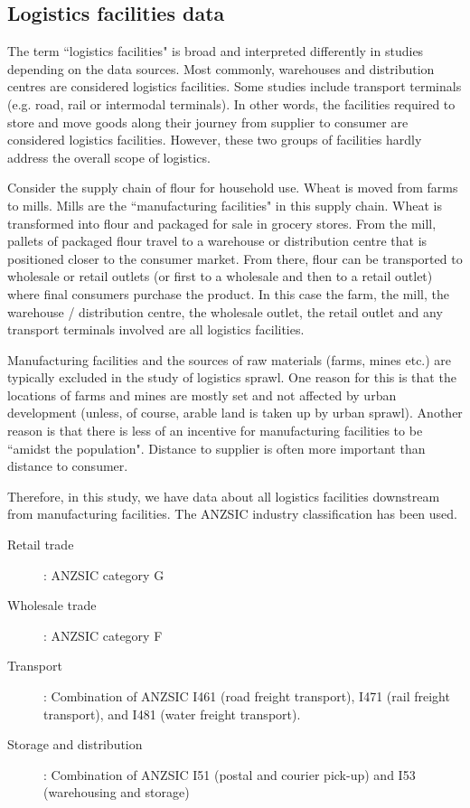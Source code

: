 \documentclass[3p, a4paper, authoryear, 11pt, fleqn, review]{elsarticle}
\begin{document}
\subsection{Logistics facilities data}
\label{sec:LogDat}
The term ``logistics facilities" is broad and interpreted differently in studies depending on the data sources. Most commonly, warehouses and distribution centres are considered logistics facilities. Some studies include transport terminals (e.g. road, rail or intermodal terminals). In other words, the facilities required to store and move goods along their journey from supplier to consumer are considered logistics facilities. However, these two groups of facilities hardly address the overall scope of logistics. 

Consider the supply chain of flour for household use. Wheat is moved from farms to mills. Mills are the ``manufacturing facilities" in this supply chain. Wheat is transformed into flour and packaged for sale in grocery stores. From the mill, pallets of packaged flour travel to a warehouse or distribution centre that is positioned closer to the consumer market. From there, flour can be transported to wholesale or retail outlets (or first to a wholesale and then to a retail outlet) where final consumers purchase the product. In this case the farm, the mill, the warehouse / distribution centre, the wholesale outlet, the retail outlet and any transport terminals involved are all logistics facilities. 

Manufacturing facilities and the sources of raw materials (farms, mines etc.) are typically excluded in the study of logistics sprawl. One reason for this is that the locations of farms and mines are mostly set and not affected by urban development (unless, of course, arable land is taken up by urban sprawl). Another reason is that there is less of an incentive for manufacturing facilities to be ``amidst the population". Distance to supplier is often more important than distance to consumer. 

Therefore, in this study, we have data about all logistics facilities downstream from manufacturing facilities. The ANZSIC industry classification has been used.

\begin{description}
\item[Retail trade]: ANZSIC category G
\item[Wholesale trade]: ANZSIC category F	
\item[Transport]: Combination of ANZSIC I461 (road freight transport), I471 (rail freight transport), and I481 (water freight transport).
\item[Storage and distribution]: Combination of ANZSIC I51 (postal and courier pick-up) and I53 (warehousing and storage)
\end{description}
\end{document}
